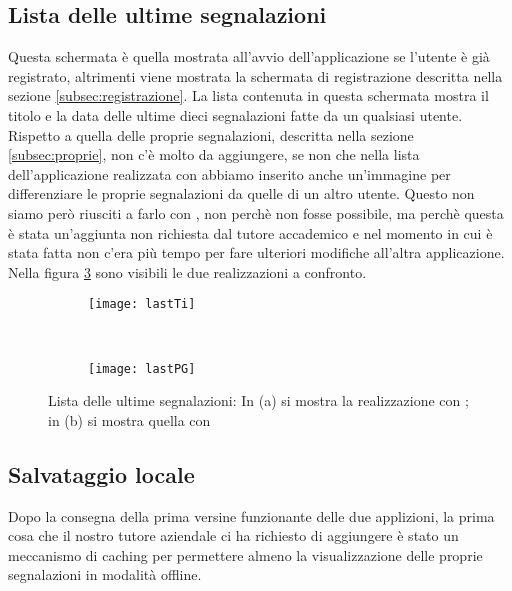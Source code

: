         \subsection{Lista delle ultime segnalazioni}
        Questa schermata è quella mostrata all'avvio dell'applicazione se
        l'utente è già registrato, altrimenti viene mostrata la schermata di
        registrazione descritta nella sezione \ref{subsec:registrazione}.
        La lista contenuta in questa schermata mostra il titolo e la data delle
        ultime dieci segnalazioni
        fatte da un qualsiasi utente. Rispetto a quella delle proprie
        segnalazioni, descritta nella sezione \ref{subsec:proprie}, non c'è
        molto da aggiungere, se non che nella lista dell'applicazione
        realizzata con \tisdk{} abbiamo inserito anche un'immagine per
        differenziare le proprie segnalazioni da quelle di un altro utente.
        Questo non siamo però riusciti a farlo con \kendomob{}, non perchè
        non fosse possibile, ma perchè questa è stata un'aggiunta non richiesta
        dal tutore accademico e nel momento in cui è stata fatta non c'era
        più tempo per fare ulteriori modifiche all'altra applicazione.
        Nella figura
        \ref{fig:last} sono visibili le due realizzazioni a confronto.

        \begin{figure}[h]
            \centering
            \begin{subfigure}[b]{0.485\textwidth}
                \texttt{[image: lastTi]}
                \caption{}
                \label{fig:tiLast}
            \end{subfigure}
            ~
            \begin{subfigure}[b]{0.485\textwidth}
                \texttt{[image: lastPG]}
                \caption{}
                \label{fig:kendoLast}
            \end{subfigure}
            \caption{Lista delle ultime segnalazioni:
            In (a) si mostra la realizzazione con \tisdk{}; in (b) si mostra
            quella con \kendomob{}
            }
            \label{fig:last}
        \end{figure}


        \subsection{Salvataggio locale}
        \label{subsec:caching}
            Dopo la consegna della prima versine funzionante delle due
            applizioni, la prima cosa che il nostro tutore aziendale ci ha
            richiesto di aggiungere è stato un meccanismo di caching per
            permettere almeno la visualizzazione delle proprie segnalazioni in
            modalità offline.

